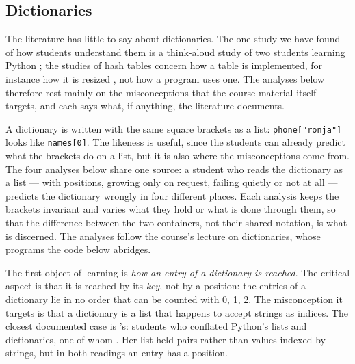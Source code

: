 \mode*
\subsection{Dictionaries}
\label{dictionaries}

The literature has little to say about dictionaries. The one study we have
found of how students understand them is a think-aloud study of two students
learning Python \autocite{Stansbury2015Dictionaries}; the studies of hash
tables concern how a table is implemented, for instance how it is resized
\autocite{Karpierz2014HashTables}, not how a program uses one. The analyses
below therefore rest mainly on the misconceptions that the course material
itself targets, and each says what, if anything, the literature documents.

A dictionary is written with the same square brackets as a list:
\texttt{phone["ronja"]} looks like \texttt{names[0]}.
The likeness is useful, since the students can already predict what the
brackets do on a list, but it is also where the misconceptions come from.
The four analyses below share one source: a student who reads the dictionary
as a list --- with positions, growing only on request, failing quietly or not
at all --- predicts the dictionary wrongly in four different places. Each
analysis keeps the brackets invariant and varies what they hold or what is
done through them, so that the difference between the two containers, not
their shared notation, is what is discerned.
The analyses follow the course's lecture on dictionaries, whose programs
the code below abridges.

The first object of learning is \emph{how an entry of a dictionary is
reached}. The critical aspect is that it is reached by its \emph{key}, not by a
position: the entries of a dictionary lie in no order that can be counted with
0, 1, 2. The misconception it targets is that a dictionary is a list that
happens to accept strings as indices.
The closest documented case is \citeauthor{Stansbury2015Dictionaries}'s:
students who conflated Python's lists and dictionaries, one of whom
. Her list held
pairs rather than values indexed by strings, but in both readings an entry has
a position.

